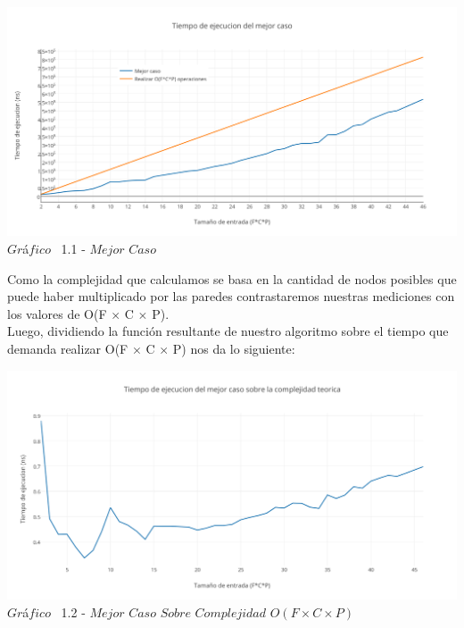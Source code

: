 \vspace*{0.3cm} \vspace*{0.3cm}
  \begin{center}
 \includegraphics[scale=0.65]{./EJ1/mejorcaso.png}
 {$Gr$\'a$fico$ \ 1.1 - $Mejor$ $Caso$}
  \end{center}
  \vspace*{0.3cm}

Como la complejidad que calculamos se basa en la cantidad de nodos posibles que puede haber multiplicado por las paredes contrastaremos nuestras mediciones con los valores de O(F $\times$ C $\times$ P).\\

Luego, dividiendo la funci\'on resultante de nuestro algoritmo sobre el tiempo que demanda realizar O(F $\times$ C $\times$ P) nos da lo siguiente:

\vspace*{0.3cm} \vspace*{0.3cm}
  \begin{center}
 \includegraphics[scale=0.65]{./EJ1/mejorcaso1.png}
 {$Gr$\'a$fico$ \ 1.2 - $Mejor$ $Caso$ $Sobre$ $Complejidad$ $O(F \times C \times P)$}
  \end{center}
  \vspace*{0.3cm}

